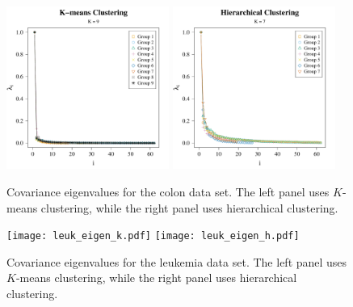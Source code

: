 \documentclass[10pt]{article}
\begin{document}
\begin{figure}[ht]
\centering
\includegraphics[width = 0.475\textwidth]{colon_eigen_k.pdf}
\includegraphics[width = 0.475\textwidth]{colon_eigen_h.pdf}

\caption{Covariance eigenvalues for the colon data set. The left panel uses $K$-means clustering, while the right panel uses hierarchical clustering.}
\label{coloneigen}
\end{figure}

\begin{figure}[ht]
\centering
\texttt{[image: leuk\_eigen\_k.pdf]}
\texttt{[image: leuk\_eigen\_h.pdf]}

\caption{Covariance eigenvalues for the leukemia data set. The left panel uses $K$-means clustering, while the right panel uses hierarchical clustering.}
\label{leukeigen}
\end{figure}
\end{document}
